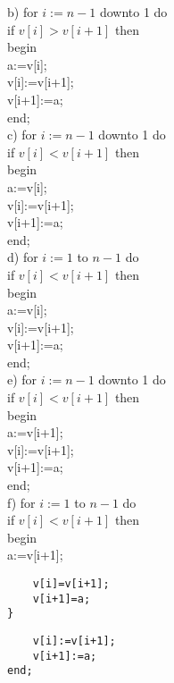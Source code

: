 b) for $i:=n-1$ downto 1 do\\
if $v[i]>v[i+1]$ then\\
begin\\[0pt]
a:=v[i];\\[0pt]
v[i]:=v[i+1];\\[0pt]
v[i+1]:=a;\\
end;\\
c) for $i:=n-1$ downto 1 do\\
if $v[i]<v[i+1]$ then\\
begin\\[0pt]
a:=v[i];\\[0pt]
v[i]:=v[i+1];\\[0pt]
v[i+1]:=a;\\
end;\\
d) for $i:=1$ to $n-1$ do\\
if $v[i]<v[i+1]$ then\\
begin\\[0pt]
a:=v[i];\\[0pt]
v[i]:=v[i+1];\\[0pt]
v[i+1]:=a;\\
end;\\
e) for $i:=n-1$ downto 1 do\\
if $v[i]<v[i+1]$ then\\
begin\\[0pt]
a:=v[i+1];\\[0pt]
v[i]:=v[i+1];\\[0pt]
v[i+1]:=a;\\
end;\\
f) for $i:=1$ to $n-1$ do\\
if $v[i]<v[i+1]$ then\\
begin\\[0pt]
a:=v[i+1];

\begin{verbatim}
    v[i]=v[i+1];
    v[i+1]=a;
}
\end{verbatim}

\begin{verbatim}
    v[i]:=v[i+1];
    v[i+1]:=a;
end;
\end{verbatim}

